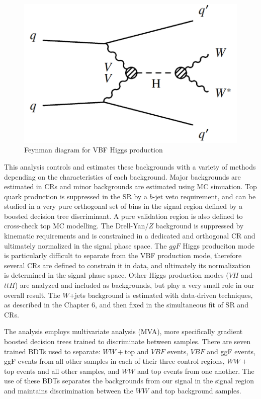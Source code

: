 \begin{figure}[!htbp]
    \centering
    \includegraphics[width=0.4\linewidth]{Pictures/fig_01b_2.pdf}
    \caption{Feynman diagram for VBF Higgs production \cite{Djouadi}}
    \label{fig:FeynmanDiagramVBF}
\end{figure}

This analysis controls and estimates these backgrounds with a variety of methods depending on the characteristics of each background. Major backgrounds are estimated in CRs and minor backgrounds are estimated using MC simuation. Top quark production is suppressed in the SR by a $b$-jet veto requirement, and can be studied in a very pure orthogonal set of bins in the signal region defined by a boosted decision tree discriminant. A pure validation region is also defined to cross-check top MC modelling. The Drell-Yan/$Z$ background is suppressed by kinematic requirements and is constrained in a dedicated and orthogonal CR and ultimately normalized in the signal phase space. The $ggF$ Higgs produciton mode is particularly difficult to separate from the VBF production mode, therefore several CRs are defined to constrain it in data, and ultimately its normalization is determined in the signal phase space. Other Higgs production modes ($VH$ and $ttH$) are analyzed and included as backgrounds, but play a very small role in our overall result. The $W$+jets background is estimated with data-driven techniques, as described in the Chapter 6, and then fixed in the simultaneous fit of SR and CRs.

The analysis employs multivariate analysis (MVA), more specifically gradient boosted decision trees trained to discriminate between samples. There are seven trained BDTs used to separate: $WW+$top and $VBF$ events, $VBF$ and ggF events, ggF events from all other samples in each of their three control regions, $WW+$top events and all other samples, and $WW$ and top events from one another. The use of these BDTs separates the backgrounds from our signal in the signal region and maintains discrimination between the $WW$ and top background samples. 

